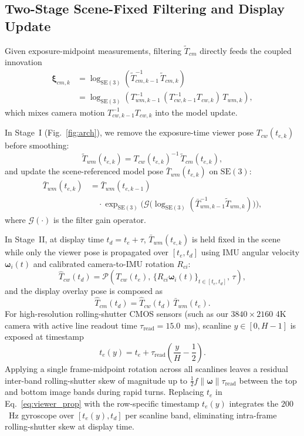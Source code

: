 \documentclass[journal]{IEEEtran}
\begin{document}
\subsection{Two-Stage Scene-Fixed Filtering and Display Update}
Given exposure-midpoint measurements, filtering $\tilde{T}_{cm}$ directly feeds the coupled innovation
\begin{align}
\boldsymbol{\xi}_{cm,k} &= \log_{\mathrm{SE}(3)}\!\left(\tilde{T}_{cm,k-1}^{-1}\,\tilde{T}_{cm,k}\right) \nonumber\\
&= \log_{\mathrm{SE}(3)}\!\left(T_{wm,k-1}^{-1}\,(T_{cw,k-1}^{-1}T_{cw,k})\,T_{wm,k}\right),
\label{eq:coupled_xi}
\end{align}
which mixes camera motion $T_{cw,k-1}^{-1}T_{cw,k}$ into the model update.

In Stage~I (Fig.~\ref{fig:arch}), we remove the exposure-time viewer pose $T_{cw}(t_{e,k})$ before smoothing:
\begin{equation}
\tilde{T}_{wm}(t_{e,k}) = T_{cw}(t_{e,k})^{-1}\,\tilde{T}_{cm}(t_{e,k}),
\label{eq:world_lift}
\end{equation}
and update the scene-referenced model pose $\bar{T}_{wm}(t_{e,k})$ on $\mathrm{SE}(3)$:
\begin{align}
\bar{T}_{wm}(t_{e,k}) &= \bar{T}_{wm}(t_{e,k-1})\nonumber\\
&\quad \cdot \exp_{\mathrm{SE}(3)}\!\Big(\mathcal{G}\big(\log_{\mathrm{SE}(3)}(\bar{T}_{wm,k-1}^{-1}\tilde{T}_{wm,k})\big)\Big),
\label{eq:world_filter}
\end{align}
where $\mathcal{G}(\cdot)$ is the filter gain operator.

In Stage~II, at display time $t_d = t_e + \tau$, $\bar{T}_{wm}(t_{e,k})$ is held fixed in the scene while only the viewer pose is propagated over $[t_e, t_d]$ using IMU angular velocity $\boldsymbol{\omega}_i(t)$ and calibrated camera-to-IMU rotation $R_{ci}$:
\begin{equation}
\hat{T}_{cw}(t_d) = \mathcal{P}\!\left(T_{cw}(t_e),\,\{R_{ci}\boldsymbol{\omega}_i(t)\}_{t\in[t_e, t_d]},\,\tau\right),
\label{eq:viewer_prop}
\end{equation}
and the display overlay pose is composed as
\begin{equation}
\hat{T}_{cm}(t_d) = \hat{T}_{cw}(t_d)\,\bar{T}_{wm}(t_e).
\label{eq:render_pose}
\end{equation}
For high-resolution rolling-shutter CMOS sensors (such as our $3840\times2160$ 4K camera with active line readout time $\tau_{\text{read}} = 15.0$~ms), scanline $y \in [0, H-1]$ is exposed at timestamp
\begin{equation}
t_e(y) = t_e + \tau_{\text{read}}\!\left(\frac{y}{H} - \frac{1}{2}\right).
\label{eq:row_time}
\end{equation}
Applying a single frame-midpoint rotation across all scanlines leaves a residual inter-band rolling-shutter skew of magnitude up to $\frac{1}{2}f\|\boldsymbol{\omega}\|\tau_{\text{read}}$ between the top and bottom image bands during rapid turns. Replacing $t_e$ in Eq.~\eqref{eq:viewer_prop} with the row-specific timestamp $t_e(y)$ integrates the $200$~Hz gyroscope over $[t_e(y), t_d]$ per scanline band, eliminating intra-frame rolling-shutter skew at display time.
\end{document}
